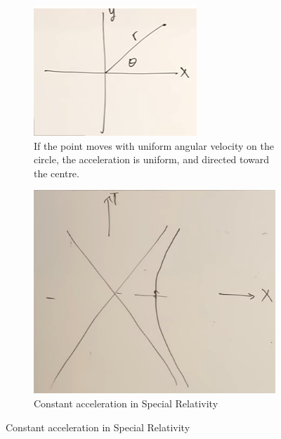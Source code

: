 \documentclass[]{article}
\begin{document}
{\begin{figure}[H]
	\caption{Constant Acceleration}
	\begin{subfigure}[t]{0.45\textwidth}
		\caption{If the point moves with uniform angular velocity on the circle, the acceleration is uniform, and directed toward the centre.}\label{fig:gr-4-polar}
		\includegraphics[width=\textwidth]{gr-4-polar}
	\end{subfigure}
	\begin{subfigure}[t]{0.45\textwidth}
		\caption{Constant acceleration in Special Relativity}\label{fig:gr-4-polar-sinh}
		\includegraphics[width=\textwidth]{gr-4-polar-sinh}
	\end{subfigure}
\end{figure}

}
\end{document}
